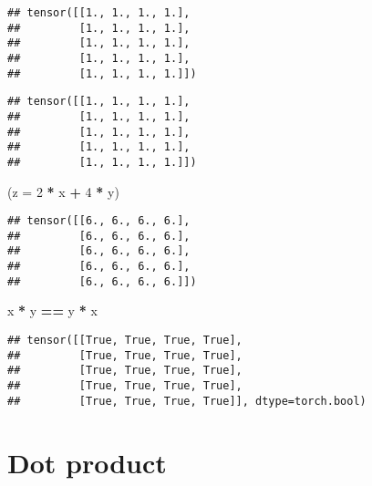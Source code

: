 \documentclass[]{book}
\newenvironment{Shaded}{\begin{snugshade}}{\end{snugshade}}
\newcommand{\DataTypeTok}[1]{\textcolor[rgb]{0.13,0.29,0.53}{#1}}
\newcommand{\DecValTok}[1]{\textcolor[rgb]{0.00,0.00,0.81}{#1}}
\newcommand{\KeywordTok}[1]{\textcolor[rgb]{0.13,0.29,0.53}{\textbf{#1}}}
\newcommand{\NormalTok}[1]{#1}
\newcommand{\OperatorTok}[1]{\textcolor[rgb]{0.81,0.36,0.00}{\textbf{#1}}}
\newcommand{\StringTok}[1]{\textcolor[rgb]{0.31,0.60,0.02}{#1}}
\begin{document}
\begin{verbatim}
## tensor([[1., 1., 1., 1.],
##         [1., 1., 1., 1.],
##         [1., 1., 1., 1.],
##         [1., 1., 1., 1.],
##         [1., 1., 1., 1.]])
\end{verbatim}

\begin{Shaded}
\end{Shaded}

\begin{verbatim}
## tensor([[1., 1., 1., 1.],
##         [1., 1., 1., 1.],
##         [1., 1., 1., 1.],
##         [1., 1., 1., 1.],
##         [1., 1., 1., 1.]])
\end{verbatim}

\begin{Shaded}
\begin{Highlighting}[]
\NormalTok{(}\DataTypeTok{z =} \DecValTok{2} \OperatorTok{*}\StringTok{ }\NormalTok{x }\OperatorTok{+}\StringTok{ }\DecValTok{4} \OperatorTok{*}\StringTok{ }\NormalTok{y)}
\end{Highlighting}
\end{Shaded}

\begin{verbatim}
## tensor([[6., 6., 6., 6.],
##         [6., 6., 6., 6.],
##         [6., 6., 6., 6.],
##         [6., 6., 6., 6.],
##         [6., 6., 6., 6.]])
\end{verbatim}

\begin{Shaded}
\begin{Highlighting}[]
\NormalTok{x }\OperatorTok{*}\StringTok{ }\NormalTok{y }\OperatorTok{==}\StringTok{ }\NormalTok{y }\OperatorTok{*}\StringTok{ }\NormalTok{x}
\end{Highlighting}
\end{Shaded}

\begin{verbatim}
## tensor([[True, True, True, True],
##         [True, True, True, True],
##         [True, True, True, True],
##         [True, True, True, True],
##         [True, True, True, True]], dtype=torch.bool)
\end{verbatim}

\hypertarget{dot-product}{%
\section{Dot product}\label{dot-product}}
\end{document}
